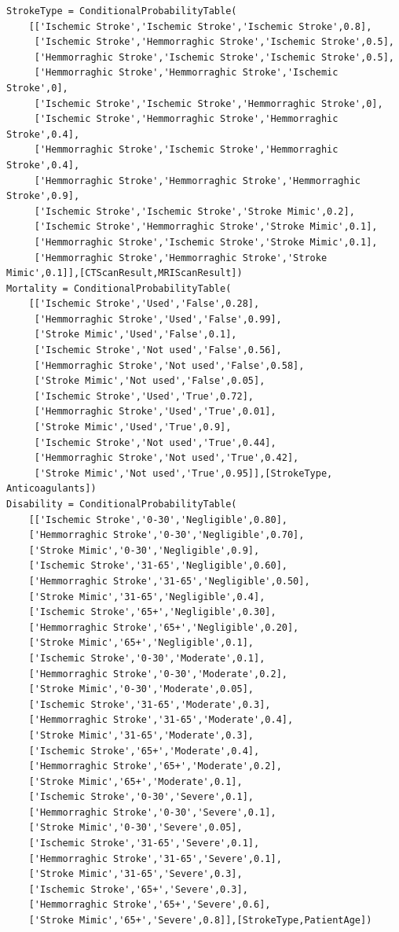 \documentclass[a4paper, 11pt]{article}
\begin{document}
\begin{lstlisting}[title=diagnosing.py]
StrokeType = ConditionalProbabilityTable(
	[['Ischemic Stroke','Ischemic Stroke','Ischemic Stroke',0.8],
	 ['Ischemic Stroke','Hemmorraghic Stroke','Ischemic Stroke',0.5],
	 ['Hemmorraghic Stroke','Ischemic Stroke','Ischemic Stroke',0.5],
	 ['Hemmorraghic Stroke','Hemmorraghic Stroke','Ischemic Stroke',0],
	 ['Ischemic Stroke','Ischemic Stroke','Hemmorraghic Stroke',0],
	 ['Ischemic Stroke','Hemmorraghic Stroke','Hemmorraghic Stroke',0.4],
	 ['Hemmorraghic Stroke','Ischemic Stroke','Hemmorraghic Stroke',0.4],
	 ['Hemmorraghic Stroke','Hemmorraghic Stroke','Hemmorraghic Stroke',0.9],
	 ['Ischemic Stroke','Ischemic Stroke','Stroke Mimic',0.2],
	 ['Ischemic Stroke','Hemmorraghic Stroke','Stroke Mimic',0.1],
	 ['Hemmorraghic Stroke','Ischemic Stroke','Stroke Mimic',0.1],
	 ['Hemmorraghic Stroke','Hemmorraghic Stroke','Stroke Mimic',0.1]],[CTScanResult,MRIScanResult])
Mortality = ConditionalProbabilityTable(
	[['Ischemic Stroke','Used','False',0.28],
	 ['Hemmorraghic Stroke','Used','False',0.99],
	 ['Stroke Mimic','Used','False',0.1],
	 ['Ischemic Stroke','Not used','False',0.56],
	 ['Hemmorraghic Stroke','Not used','False',0.58],
	 ['Stroke Mimic','Not used','False',0.05],
	 ['Ischemic Stroke','Used','True',0.72],
	 ['Hemmorraghic Stroke','Used','True',0.01],
	 ['Stroke Mimic','Used','True',0.9],
	 ['Ischemic Stroke','Not used','True',0.44],
	 ['Hemmorraghic Stroke','Not used','True',0.42],
	 ['Stroke Mimic','Not used','True',0.95]],[StrokeType, Anticoagulants])
Disability = ConditionalProbabilityTable(
	[['Ischemic Stroke','0-30','Negligible',0.80],
	['Hemmorraghic Stroke','0-30','Negligible',0.70],
	['Stroke Mimic','0-30','Negligible',0.9],
	['Ischemic Stroke','31-65','Negligible',0.60],
	['Hemmorraghic Stroke','31-65','Negligible',0.50],
	['Stroke Mimic','31-65','Negligible',0.4],
	['Ischemic Stroke','65+','Negligible',0.30],
	['Hemmorraghic Stroke','65+','Negligible',0.20],
	['Stroke Mimic','65+','Negligible',0.1],
	['Ischemic Stroke','0-30','Moderate',0.1],
	['Hemmorraghic Stroke','0-30','Moderate',0.2],
	['Stroke Mimic','0-30','Moderate',0.05],
	['Ischemic Stroke','31-65','Moderate',0.3],
	['Hemmorraghic Stroke','31-65','Moderate',0.4],
	['Stroke Mimic','31-65','Moderate',0.3],
	['Ischemic Stroke','65+','Moderate',0.4],
	['Hemmorraghic Stroke','65+','Moderate',0.2],
	['Stroke Mimic','65+','Moderate',0.1],
	['Ischemic Stroke','0-30','Severe',0.1],
	['Hemmorraghic Stroke','0-30','Severe',0.1],
	['Stroke Mimic','0-30','Severe',0.05],
	['Ischemic Stroke','31-65','Severe',0.1],
	['Hemmorraghic Stroke','31-65','Severe',0.1],
	['Stroke Mimic','31-65','Severe',0.3],
	['Ischemic Stroke','65+','Severe',0.3],
	['Hemmorraghic Stroke','65+','Severe',0.6],
	['Stroke Mimic','65+','Severe',0.8]],[StrokeType,PatientAge])


\end{lstlisting}
\end{document}
